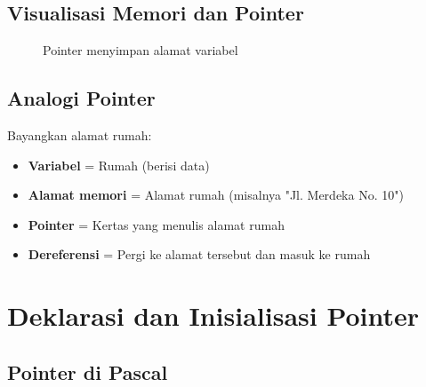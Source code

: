 \documentclass[../main.tex]{subfiles}
\begin{document}
\subsection{Visualisasi Memori dan Pointer}

\begin{figure}[H]
  \centering
  \caption{Pointer menyimpan alamat variabel}
\end{figure}

\subsection{Analogi Pointer}

Bayangkan alamat rumah:
\begin{itemize}
  \item \textbf{Variabel} = Rumah (berisi data)
  \item \textbf{Alamat memori} = Alamat rumah (misalnya "Jl. Merdeka No. 10")
  \item \textbf{Pointer} = Kertas yang menulis alamat rumah
  \item \textbf{Dereferensi} = Pergi ke alamat tersebut dan masuk ke rumah
\end{itemize}

\section{Deklarasi dan Inisialisasi Pointer}

\subsection{Pointer di Pascal}
\end{document}
